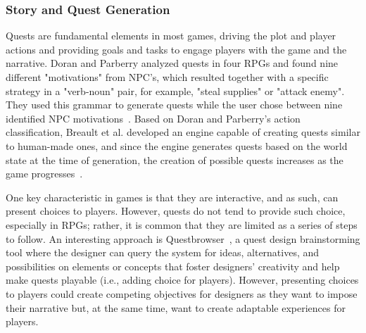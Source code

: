 \subsubsection{Story and Quest Generation}

Quests are fundamental elements in most games, driving the plot and player actions and providing goals and tasks to engage players with the game and the narrative. Doran and Parberry analyzed quests in four RPGs and found nine different "motivations" from NPC's, which resulted together with a specific strategy in a "verb-noun" pair, for example, "steal supplies" or "attack enemy". They used this grammar to generate quests while the user chose between nine identified NPC motivations~. Based on Doran and Parberry's action classification, Breault et al. developed an engine capable of creating quests similar to human-made ones, and since the engine generates quests based on the world state at the time of generation, the creation of possible quests increases as the game progresses~. 

One key characteristic in games is that they are interactive, and as such, can present choices to players. However, quests do not tend to provide such choice, especially in RPGs; rather, it is common that they are limited as a series of steps to follow.  An interesting approach is Questbrowser~, a quest design brainstorming tool where the designer can query the system for ideas, alternatives, and possibilities on elements or concepts that foster designers' creativity and help make quests playable (i.e., adding choice for players). However, presenting choices to players could create competing objectives for designers as they want to impose their narrative but, at the same time, want to create adaptable experiences for players. %

